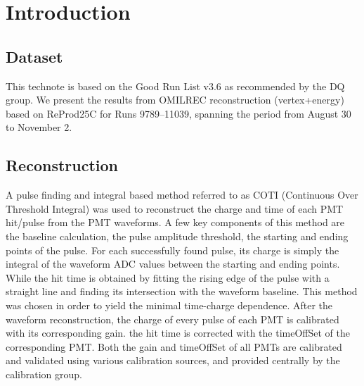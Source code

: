 \section{Introduction}

\subsection{Dataset}

This technote is based on the Good Run List v3.6 as recommended by the DQ group. We present the  results from OMILREC reconstruction (vertex+energy) based on ReProd25C for Runs 9789–11039, spanning the period from August 30 to November 2.

\subsection{Reconstruction}
A pulse finding and integral based method referred to as COTI (Continuous Over Threshold Integral) was used to reconstruct the charge and time of each PMT hit/pulse from the PMT waveforms. 
A few key components of this method are the baseline calculation, the pulse amplitude threshold, the starting and ending points of the pulse.
For each successfully found pulse, its charge is simply the integral of the waveform ADC values between the starting and ending points. While the hit time is obtained by fitting the rising edge of the pulse with a straight line and finding its intersection with the waveform baseline. This method was chosen in order to yield the minimal time-charge dependence. 
After the waveform reconstruction, the charge of every pulse of each PMT is calibrated with its corresponding gain. the hit time is corrected with the timeOffSet of the corresponding PMT. Both the gain and timeOffSet of all PMTs are calibrated and validated using various calibration sources, and provided centrally by the calibration group.


